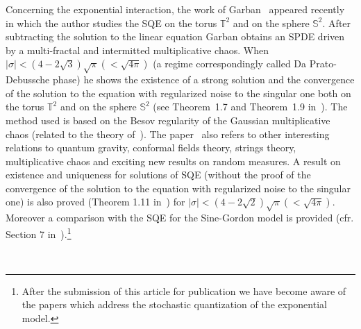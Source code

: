 \documentclass[a4paper,10pt]{article}
\begin{document}
Concerning the exponential interaction, the work of
Garban~{\cite{Garban2018}} appeared recently in which the author studies the
SQE on the torus $\mathbb{T}^2$ and on the sphere $\mathbb{S}^2$. After
subtracting the solution to the linear equation Garban obtains an SPDE driven
by a multi-fractal and intermitted multiplicative chaos. When $| \sigma | <
\left( 4 - 2 \sqrt{3} \right) \sqrt{\pi} \left( < \sqrt{4 \pi} \right)$ (a
regime correspondingly called Da Prato-Debussche phase) he shows the existence
of a strong solution and the convergence of the solution to the equation with
regularized noise to the singular one both on the torus $\mathbb{T}^2$ and on
the sphere $\mathbb{S}^2$ (see Theorem~1.7 and Theorem~1.9
in~{\cite{Garban2018}}). The method used is based on the Besov regularity of
the Gaussian multiplicative chaos (related to the theory of~{\cite{Ka}}). The
paper~{\cite{Garban2018}} also refers to other interesting relations to
quantum gravity, conformal fields theory, strings theory, multiplicative chaos
and exciting new results on random measures. A result on existence and
uniqueness for solutions of SQE (without the proof of the convergence of the
solution to the equation with regularized noise to the singular one) is also
proved (Theorem 1.11 in~{\cite{Garban2018}}) for $| \sigma | < \left( 4 - 2
\sqrt{2} \right) \sqrt{\pi} \left( < \sqrt{4 \pi} \right)$. Moreover a
comparison with the SQE for the Sine-Gordon model is provided (cfr. Section 7
in~{\cite{Garban2018}}).\footnote{After the submission of this article for
publication we have become aware of the papers
{\cite{HoKaKu,HoKaKu2020,OhTriYu2020,OhTriYu}} which address the stochastic
quantization of the exponential model.}

\
\end{document}
